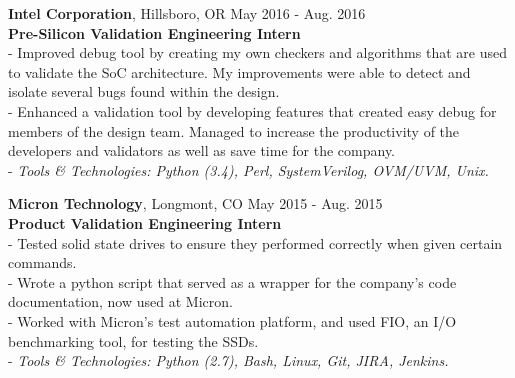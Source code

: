 \documentclass{resume}
\begin{document}
\begin{flushleft}
\textbf{Intel Corporation}, Hillsboro, OR \hfill May 2016 - Aug. 2016\\
\textbf{Pre-Silicon Validation Engineering Intern}\\
{\footnotesize
\ttab- Improved debug tool by creating my own checkers and algorithms that are used to validate the SoC architecture. My \ttab improvements were able to detect and isolate several bugs found within the design.\\
\ttab- Enhanced a validation tool by developing features that created easy debug for members of the design team. Managed to \ttab increase the productivity of the developers and validators as well as save time for the company. \\
\ttab- \textit{Tools \& Technologies: Python (3.4), Perl, SystemVerilog, OVM/UVM, Unix.}\\[3mm]
}

\textbf{Micron Technology}, Longmont, CO \hfill May 2015 - Aug. 2015\\
\textbf{Product Validation Engineering Intern}\\
{\footnotesize
\ttab- Tested solid state drives to ensure they performed correctly when given certain commands.\\
\ttab- Wrote a python script that served as a wrapper for the company's code documentation, now used at Micron.\\
\ttab- Worked with Micron's test automation platform, and used FIO, an I/O benchmarking tool, for testing the SSDs.\\
\ttab- \textit{Tools \& Technologies: Python (2.7), Bash, Linux, Git, JIRA, Jenkins.}\\[3mm]
}



\end{flushleft}
\end{document}
